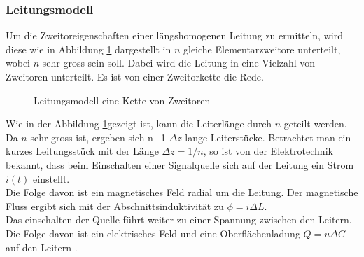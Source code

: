\subsubsection{Leitungsmodell}
Um die Zweitoreigenschaften einer längshomogenen Leitung zu ermitteln, wird diese wie in
Abbildung \ref{fig:LeitungsmodellZweitorKette} dargestellt in $n$ gleiche Elementarzweitore unterteilt, wobei $n$ sehr gross sein soll. Dabei wird die Leitung in eine Vielzahl von Zweitoren unterteilt. Es ist von einer Zweitorkette die Rede.
\begin{figure}[h]
	\begin{center}
	\end{center}
\caption{Leitungsmodell eine Kette von Zweitoren}
\label{fig:LeitungsmodellZweitorKette}
\end{figure}
Wie in der Abbildung \ref{fig:LeitungsmodellZweitorKette}gezeigt ist, kann die Leiterlänge durch $n$ geteilt werden. Da $n$ sehr gross ist, ergeben sich n+1 $\Delta z$ lange Leiterstücke. Betrachtet man ein kurzes Leitungsstück mit der Länge $\Delta z = 1/n$, so ist von der Elektrotechnik  bekannt, dass beim Einschalten einer Signalquelle sich auf der Leitung ein Strom $i(t)$ einstellt. \\Die Folge davon ist ein magnetisches Feld radial um die Leitung. Der magnetische Fluss ergibt sich mit der Abschnittsinduktivität zu $\phi = i  \Delta L$. \\
Das einschalten der Quelle führt weiter zu einer  Spannung zwischen den Leitern. Die Folge davon ist ein elektrisches Feld und eine Oberflächenladung $Q = u  \Delta C$ auf den Leitern \cite{Emant}.

